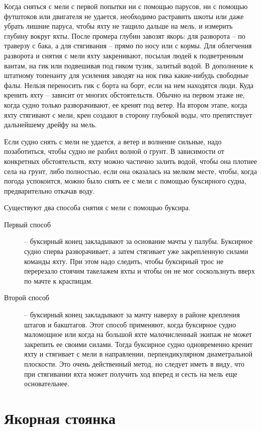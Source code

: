 Когда сняться с мели с первой попытки ни с помощью парусов, ни с помощью футштоков или двигателя не удается, необходимо растравить шкоты или даже убрать лишние паруса, чтобы яхту не тащило дальше на мель, и измерить глубину вокруг яхты. После промера глубин завозят якорь: для разворота \--- по траверзу с бака, а для стягивания \--- прямо по носу или с кормы. Для облегчения разворота и снятия с мели яхту закренивают, посылая людей к подветренным вантам, на гик или подвешивая под гиком тузик, залитый водой. В дополнение к штатному топенанту для усиления заводят на нок гика какие-нибудь свободные фалы. Нельзя переносить гик с борта на борт, если на нем находятся люди. Куда кренить яхту \--- зависит от многих обстоятельств. Обычно на первом этаже не, когда судно только разворачивают, ее кренят под ветер. На втором этапе, когда яхту стягивают с мели, крен создают в сторону глубокой воды, что препятствует дальнейшему дрейфу на мель.

Если судно снять с мели не удается, а ветер и волнение сильные, надо позаботиться, чтобы судно не разбил волной о грунт. В зависимости от конкретных обстоятельств, яхту можно частично залить водой, чтобы она плотнее села на грунт, либо полностью, если она оказалась на мелком месте, чтобы, когда погода успокоится, можно было снять ее с мели с помощью буксирного судна, предварительно откачав воду.

Существуют два способа снятия с мели с помощью буксира.
\begin{description}
\item[Первый способ] \--- буксирный конец закладывают за основание мачты у палубы. Буксирное судно сперва разворачивает, а затем стягивает уже закрепленную силами команды яхту. При этом надо следить, чтобы буксирный трос не перерезало стоячим такелажем яхты и чтобы он не мог соскользнуть вверх по мачте к краспицам.
\item[Второй способ] \--- буксирный конец закладывают за мачту наверху в районе крепления штагов и бакштагов. Этот способ применяют, когда буксирное судно маломощное или когда на большой яхте малочисленный экипаж не может закрепить ее своими силами. Тогда буксирное судно одновременно кренит яхту и стягивает с мели в направлении, перпендикулярном диаметральной плоскости. Это очень действенный метод, но следует иметь в виду, что при стягивании яхта может получить ход вперед и сесть на мель еще основательнее.
\end{description}

\section{Якорная стоянка}

